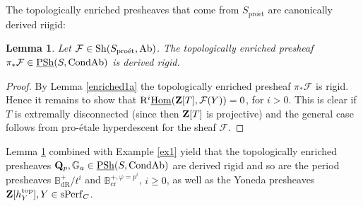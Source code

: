 \documentclass[10pt]{amsart}
\newtheorem{lemma}[equation]{Lemma}
\theoremstyle{definition}
\theoremstyle{remark}
\def\phi{\varphi}
\newcommand{\dr}{\operatorname{dR} }
\newcommand{\proeet}{\operatorname{pro\acute{e}t} }
\newcommand{\uHom}{\underline{{\rm{Hom}} }}
\newcommand{\crr}{\operatorname{cr} }
\newcommand{\sff}{{\mathcal{F}}}
\numberwithin{equation}{section}
\def\R{{\mathrm R}}
\def\Q{{\bf Q}} \def\Z{{\bf Z}}
\numberwithin{equation}{section}
\begin{document}
 The topologically enriched presheaves that come from $S_{\proeet}$ are canonically derived riigid:
 \begin{lemma} \label{enriched1c} Let $\sff \in {\rm Sh}(S_{\proeet},{\rm Ab})$. The topologically enriched presheaf $\pi_*\sff\in \underline{{\rm PSh}}(S,{\rm CondAb})$ is derived rigid.
 \end{lemma}
 \begin{proof} By Lemma \ref{enriched1a} the topologically enriched presheaf $\pi_*\sff$ is rigid. Hence it remains to show that $\R^i\uHom(\Z[T],\sff(Y))=0$, for $i>0$. This is clear if $T$ is extremally disconnected (since then $\Z[T]$ is projective) and the general case follows
 from pro-\'etale hyperdescent for the sheaf $\sff$. 
 \end{proof} 
  Lemma \ref{enriched1c} combined with Example \ref{ex1} yield  that the topologically enriched presheaves $\Q_p, {\mathbb G}_a\in \underline{{\rm PSh}}(S,{\rm CondAb})$ are derived rigid  and so are the period presheaves ${\mathbb B}^+_{\dr}/t^i$ and ${\mathbb B}_{\crr}^{+,\phi=p^i}$, $i\geq 0$, as well as the Yoneda presheaves $\Z[h^{\rm top}_Y], Y\in {\rm sPerf}_C$.

  
\end{document}
